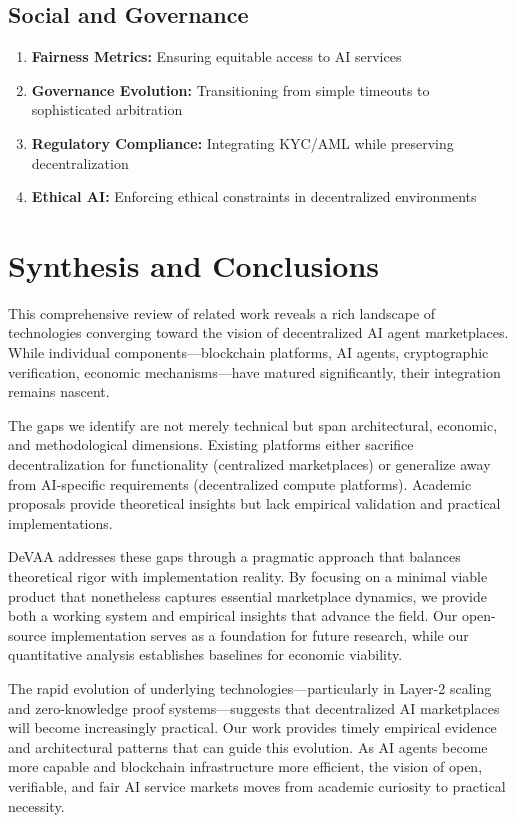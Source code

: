 \subsection{Social and Governance}
\begin{enumerate}
    \item \textbf{Fairness Metrics:} Ensuring equitable access to AI services
    \item \textbf{Governance Evolution:} Transitioning from simple timeouts to sophisticated arbitration
    \item \textbf{Regulatory Compliance:} Integrating KYC/AML while preserving decentralization
    \item \textbf{Ethical AI:} Enforcing ethical constraints in decentralized environments
\end{enumerate}

\section{Synthesis and Conclusions}

This comprehensive review of related work reveals a rich landscape of technologies converging toward the vision of decentralized AI agent marketplaces. While individual components—blockchain platforms, AI agents, cryptographic verification, economic mechanisms—have matured significantly, their integration remains nascent. 

The gaps we identify are not merely technical but span architectural, economic, and methodological dimensions. Existing platforms either sacrifice decentralization for functionality (centralized marketplaces) or generalize away from AI-specific requirements (decentralized compute platforms). Academic proposals provide theoretical insights but lack empirical validation and practical implementations.

DeVAA addresses these gaps through a pragmatic approach that balances theoretical rigor with implementation reality. By focusing on a minimal viable product that nonetheless captures essential marketplace dynamics, we provide both a working system and empirical insights that advance the field. Our open-source implementation serves as a foundation for future research, while our quantitative analysis establishes baselines for economic viability.

The rapid evolution of underlying technologies—particularly in Layer-2 scaling and zero-knowledge proof systems—suggests that decentralized AI marketplaces will become increasingly practical. Our work provides timely empirical evidence and architectural patterns that can guide this evolution. As AI agents become more capable and blockchain infrastructure more efficient, the vision of open, verifiable, and fair AI service markets moves from academic curiosity to practical necessity.


